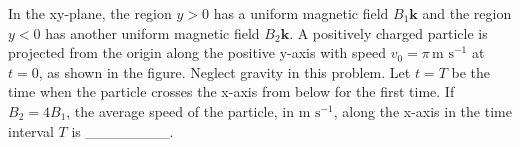 
\item In the xy-plane, the region \(y > 0\) has a uniform magnetic field \(B_1\mathbf{k}\) and the region \(y < 0\) has another uniform magnetic field \(B_2\mathbf{k}\). A positively charged particle is projected from the origin along the positive y-axis with speed \(v_0 = \pi \, \text{m s}^{-1}\) at \(t = 0\), as shown in the figure. Neglect gravity in this problem. Let \(t = T\) be the time when the particle crosses the x-axis from below for the first time. If \(B_2 = 4B_1\), the average speed of the particle, in \(\text{m s}^{-1}\), along the x-axis in the time interval \(T\) is \_\_\_\_\_\_\_\_.
\begin{center}
\end{center}
